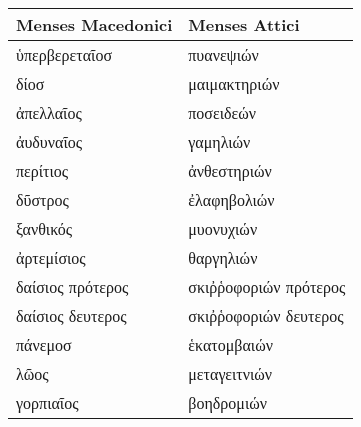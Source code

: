 %
\footnotesize
\centering
\begin{tabular}{@{}l l@{}}
\toprule
 Menses Macedonici    & Menses Attici \\
\midrule
 \textgreek{ὑπερβερεταῖοσ} &
 \textgreek{πυανεψιών}
\\
 \textgreek{δίοσ} &
 \textgreek{μαιμακτηριών}
\\
 \textgreek{ἀπελλαῖος} &
 \textgreek{ποσειδεών}
\\
\midrule
 \textgreek{ἀυδυναῖος} &
 \textgreek{γαμηλιών}
\\
 \textgreek{περίτιος} &
 \textgreek{ἀνθεστηριών}
\\
 \textgreek{δῦστρος} &
 \textgreek{ἐλαφηβολιών}
\\
\midrule
 \textgreek{ξανθικός} &
 \textgreek{μυονυχιών}
\\
 \textgreek{ἀρτεμίσιος} &
 \textgreek{θαργηλιών}
\\
 \textgreek{δαίσιος πρότερος} &
 \textgreek{σκιῤῥοφοριών πρότερος}
\\
 \textgreek{δαίσιος δευτερος} &
 \textgreek{σκιῤῥοφοριών δευτερος}
\\
\midrule
 \textgreek{πάνεμοσ} &
 \textgreek{ἑκατομβαιών}
\\
 \textgreek{λῶος} & 
 \textgreek{μεταγειτνιών}
\\
 \textgreek{γορπιαῖος} &
 \textgreek{βοηδρομιών}
\\
\bottomrule
\end{tabular}
%
